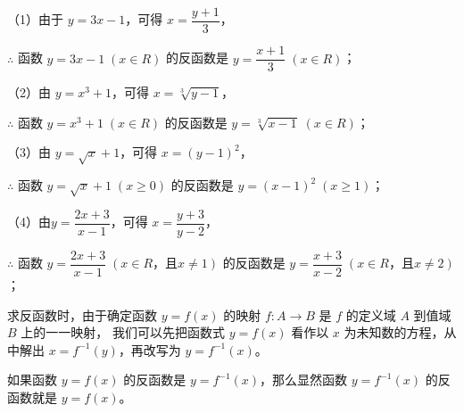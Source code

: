 \jie （1）由于 $y = 3x -1$，可得 $x = \dfrac{y + 1}{3}$，

$\therefore$ 函数 $y = 3x - 1 \; (x \in R)$ 的反函数是 $y = \dfrac{x + 1}{3} \; (x \in R)$；

（2）由 $y = x^3 + 1$，可得 $x = \sqrt[3]{y - 1}$，

$\therefore$ 函数 $y = x^3 + 1 \; (x \in R)$ 的反函数是 $y = \sqrt[3]{x - 1} \; (x \in R)$；

（3）由 $y = \sqrt{x} + 1$，可得 $x = (y - 1)^2$，

$\therefore$ 函数 $y = \sqrt{x} + 1 \; (x \geqslant 0)$ 的反函数是 $y = (x - 1)^2 \; (x \geqslant 1)$；

\vspace{0.5em}
（4）由$y = \dfrac{2x + 3}{x - 1}$，可得 $x = \dfrac{y + 3}{y - 2}$，
\vspace{0.5em}

$\therefore$ 函数 $y = \dfrac{2x + 3}{x - 1} \; (x \in R \text{，且} x \neq 1)$ 的反函数是 $y = \dfrac{x + 3}{x - 2} \; (x \in R \text{，且} x \neq 2)$；
\vspace{0.5em}

求反函数时，由于确定函数 $y = f(x)$ 的映射 $f: A \to B$ 是 $f$ 的定义域 $A$ 到值域 $B$ 上的一一映射，
我们可以先把函数式 $y = f(x)$ 看作以 $x$ 为未知数的方程，从中解出 $x = f^{-1}(y)$，再改写为 $y = f^{-1}(x)$。

如果函数 $y = f(x)$ 的反函数是 $y = f^{-1}(x)$，那么显然函数 $y = f^{-1}(x)$ 的反函数就是 $y = f(x)$。

\lianxi

\begin{xiaotis}


\begin{xiaoxiaotis}
    

    \vspace{0.5em}
    \vspace{0.5em}


    \vspace{0.5em}
    \vspace{0.5em}

\end{xiaoxiaotis}

\xiaoti{}

\begin{xiaoxiaotis}
    \vspace{-1.7em}
    \begin{minipage}{0.9\textwidth}
    \end{minipage}
    
\end{xiaoxiaotis}

\end{xiaotis}

